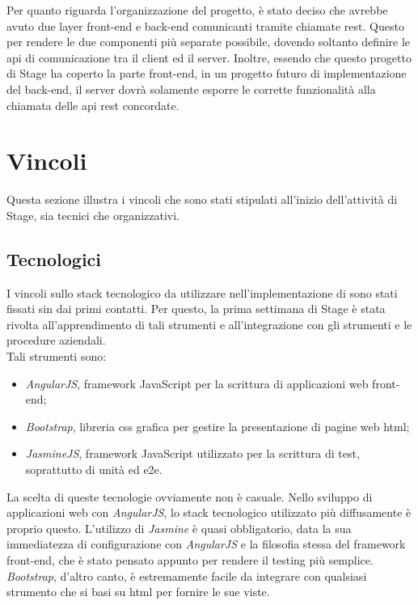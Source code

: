 Per quanto riguarda l'organizzazione del progetto, è stato deciso che \myTitle{} avrebbe avuto due layer \gls{front-end} e \gls{back-end} comunicanti tramite chiamate \gls{rest}. Questo per rendere le due componenti più separate possibile, dovendo soltanto definire le \gls{api} di comunicazione tra il client ed il server. Inoltre, essendo che questo progetto di Stage ha coperto la parte \gls{front-end}, in un progetto futuro di implementazione del \gls{back-end}, il server dovrà solamente esporre le corrette funzionalità alla chiamata delle \gls{api} \gls{rest} concordate.





\section{Vincoli}
Questa sezione illustra i vincoli che sono stati stipulati all'inizio dell'attività di Stage, sia tecnici che organizzativi.

\subsection{Tecnologici}
I vincoli sullo stack tecnologico da utilizzare nell'implementazione di \myTitle{} sono stati fissati sin dai primi contatti. Per questo, la prima settimana di Stage è stata rivolta all'apprendimento di tali strumenti e all'integrazione con gli strumenti e le procedure aziendali.\\
Tali strumenti sono:
\begin{itemize}
	\item \emph{AngularJS}, framework JavaScript per la scrittura di applicazioni web \gls{front-end};
	\item \emph{Bootstrap}, libreria \gls{css} grafica per gestire la presentazione di pagine web \gls{html};
	\item \emph{JasmineJS}, framework JavaScript utilizzato per la scrittura di test, soprattutto di unità ed \gls{e2e}. 
\end{itemize}
La scelta di queste tecnologie ovviamente non è casuale. Nello sviluppo di applicazioni web con \emph{AngularJS}, lo stack tecnologico utilizzato più diffusamente è proprio questo. L'utilizzo di \emph{Jasmine} è quasi obbligatorio, data la sua immediatezza di configurazione con \emph{AngularJS} e la filosofia stessa del framework \gls{front-end}, che è stato pensato appunto per rendere il testing più semplice.\\
\emph{Bootstrap}, d'altro canto, è estremamente facile da integrare con qualsiasi strumento che si basi su \gls{html} per fornire le sue viste.

